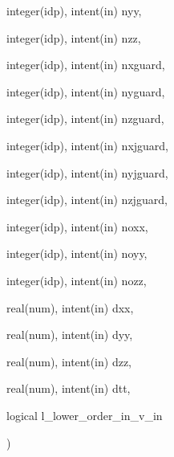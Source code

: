 {\begin{DoxyParamCaption}
\item[{integer(idp), intent(in)}]{nyy, }
\item[{integer(idp), intent(in)}]{nzz, }
\item[{integer(idp), intent(in)}]{nxguard, }
\item[{integer(idp), intent(in)}]{nyguard, }
\item[{integer(idp), intent(in)}]{nzguard, }
\item[{integer(idp), intent(in)}]{nxjguard, }
\item[{integer(idp), intent(in)}]{nyjguard, }
\item[{integer(idp), intent(in)}]{nzjguard, }
\item[{integer(idp), intent(in)}]{noxx, }
\item[{integer(idp), intent(in)}]{noyy, }
\item[{integer(idp), intent(in)}]{nozz, }
\item[{real(num), intent(in)}]{dxx, }
\item[{real(num), intent(in)}]{dyy, }
\item[{real(num), intent(in)}]{dzz, }
\item[{real(num), intent(in)}]{dtt, }
\item[{logical}]{l\+\_\+lower\+\_\+order\+\_\+in\+\_\+v\+\_\+in}
\end{DoxyParamCaption}
)}\hypertarget{particles__push_8_f90_a59d6ed8231bfda3a4c6d828c848b18ff}{}\label{particles__push_8_f90_a59d6ed8231bfda3a4c6d828c848b18ff}
